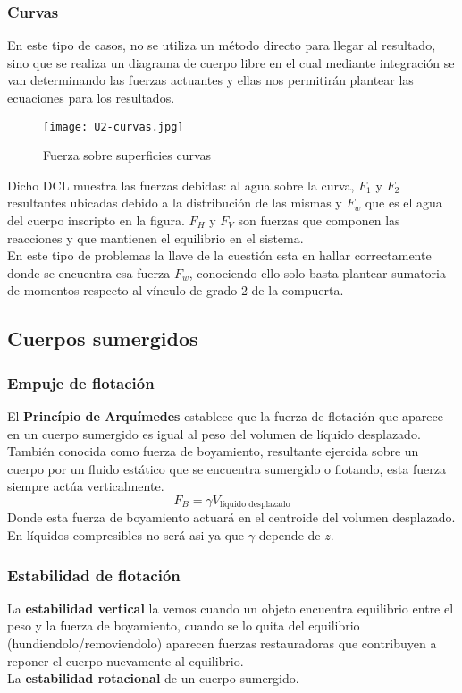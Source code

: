 \subsubsection{Curvas}
En este tipo de casos, no se utiliza un método directo para llegar al resultado, sino que se realiza un diagrama de cuerpo libre en el cual mediante integración se van determinando las fuerzas actuantes y ellas nos permitirán plantear las ecuaciones para los resultados.
\begin{figure}[h]
	\centering
	\texttt{[image: U2-curvas.jpg]}
	\caption{Fuerza sobre superficies curvas}
	\label{fig:fuerz-sup-curv}
\end{figure}
Dicho DCL muestra las fuerzas debidas: al agua sobre la curva, $F_{1}$ y $F_{2}$ resultantes ubicadas debido a la distribución de las mismas y $F_{w}$ que es el agua del cuerpo inscripto en la figura. $F_{H}$ y $F_{V}$ son fuerzas que componen las reacciones y que mantienen el equilibrio en el sistema.\\
En este tipo de problemas la llave de la cuestión esta en hallar correctamente donde se encuentra esa fuerza $F_{w}$, conociendo ello solo basta plantear sumatoria de momentos respecto al vínculo de grado 2 de la compuerta.

\subsection{Cuerpos sumergidos}
\subsubsection{Empuje de flotación}
El \textbf{Princípio de Arquímedes} establece que la fuerza de flotación que aparece en un cuerpo sumergido es igual al peso del volumen de líquido desplazado.\\
También conocida como fuerza de boyamiento, resultante ejercida sobre un cuerpo por un fluido estático que se encuentra sumergido o flotando, esta fuerza siempre actúa verticalmente.
\begin{equation}
	F_{B}=\gamma V_{\text{líquido desplazado}}
	\label{ec:fuerz-boy}
\end{equation}
Donde esta fuerza de boyamiento actuará en el centroide del volumen desplazado. En líquidos compresibles no será asi ya que $\gamma$ depende de $z$.

\subsubsection{Estabilidad de flotación}
La \textbf{estabilidad vertical} la vemos cuando un objeto encuentra equilibrio entre el peso y la fuerza de boyamiento, cuando se lo quita del equilibrio (hundiendolo/removiendolo) aparecen fuerzas restauradoras que contribuyen a reponer el cuerpo nuevamente al equilibrio.\\
La \textbf{estabilidad rotacional} de un cuerpo sumergido.

